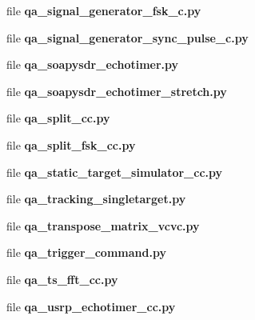 \begin{DoxyCompactItemize}
\item 
file {\bf qa\+\_\+signal\+\_\+generator\+\_\+fsk\+\_\+c.\+py}
\item 
file {\bf qa\+\_\+signal\+\_\+generator\+\_\+sync\+\_\+pulse\+\_\+c.\+py}
\item 
file {\bf qa\+\_\+soapysdr\+\_\+echotimer.\+py}
\item 
file {\bf qa\+\_\+soapysdr\+\_\+echotimer\+\_\+stretch.\+py}
\item 
file {\bf qa\+\_\+split\+\_\+cc.\+py}
\item 
file {\bf qa\+\_\+split\+\_\+fsk\+\_\+cc.\+py}
\item 
file {\bf qa\+\_\+static\+\_\+target\+\_\+simulator\+\_\+cc.\+py}
\item 
file {\bf qa\+\_\+tracking\+\_\+singletarget.\+py}
\item 
file {\bf qa\+\_\+transpose\+\_\+matrix\+\_\+vcvc.\+py}
\item 
file {\bf qa\+\_\+trigger\+\_\+command.\+py}
\item 
file {\bf qa\+\_\+ts\+\_\+fft\+\_\+cc.\+py}
\item 
file {\bf qa\+\_\+usrp\+\_\+echotimer\+\_\+cc.\+py}
\end{DoxyCompactItemize}
